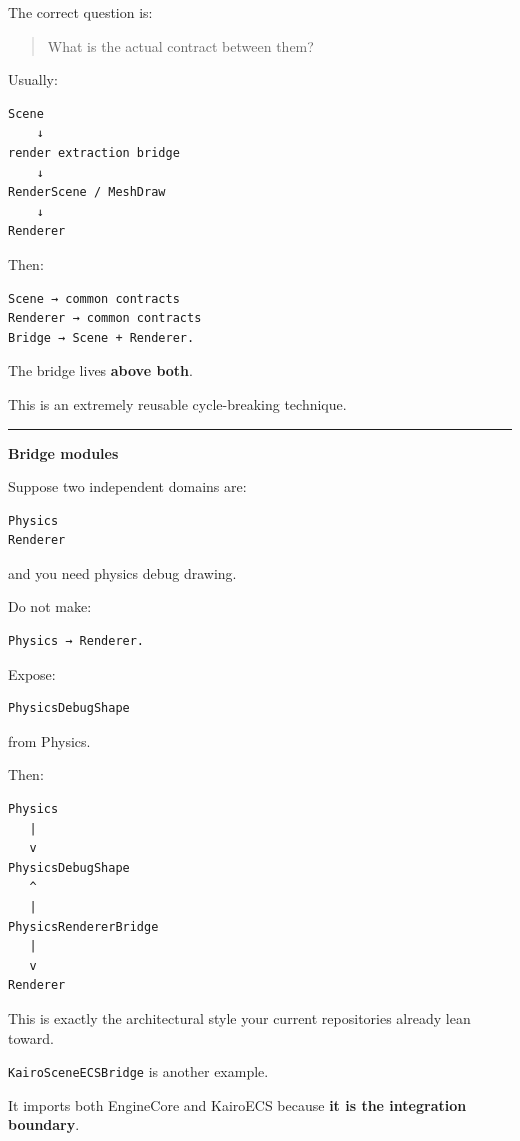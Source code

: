 The correct question is:

\begin{quote}
What is the actual contract between them?
\end{quote}

Usually:

\begin{verbatim}
Scene
    ↓
render extraction bridge
    ↓
RenderScene / MeshDraw
    ↓
Renderer
\end{verbatim}

Then:

\begin{verbatim}
Scene → common contracts
Renderer → common contracts
Bridge → Scene + Renderer.
\end{verbatim}

The bridge lives \textbf{above both}.

This is an extremely reusable cycle-breaking technique.

\begin{center}\rule{0.5\linewidth}{0.5pt}\end{center}

\textbf{Bridge modules}

Suppose two independent domains are:

\begin{verbatim}
Physics
Renderer
\end{verbatim}

and you need physics debug drawing.

Do not make:

\begin{verbatim}
Physics → Renderer.
\end{verbatim}

Expose:

\begin{verbatim}
PhysicsDebugShape
\end{verbatim}

from Physics.

Then:

\begin{verbatim}
Physics
   |
   v
PhysicsDebugShape
   ^
   |
PhysicsRendererBridge
   |
   v
Renderer
\end{verbatim}

This is exactly the architectural style your current repositories already lean toward.

\texttt{KairoSceneECSBridge} is another example.

It imports both EngineCore and KairoECS because \textbf{it is the integration boundary}.

